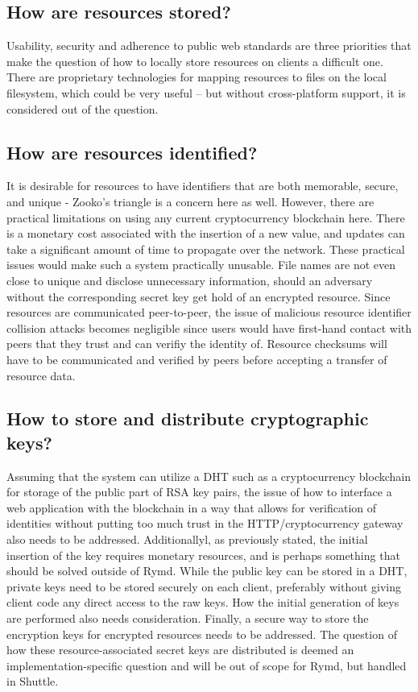 \subsection{How are resources stored?}
Usability, security and adherence to public web standards are three priorities that make the question of how to locally store resources on clients a difficult one. There are proprietary technologies for mapping resources to files on the local filesystem, which could be very useful – but without cross-platform support, it is considered out of the question.

\subsection{How are resources identified?}
It is desirable for resources to have identifiers that are both memorable, secure, and unique - Zooko’s triangle is a concern here as well. However, there are practical limitations on using any current cryptocurrency blockchain here. There is a monetary cost associated with the insertion of a new value, and updates can take a significant amount of time to propagate over the network. These practical issues would make such a system practically unusable. File names are not even close to unique and disclose unnecessary information, should an adversary without the corresponding secret key get hold of an encrypted resource. Since resources are communicated peer-to-peer, the issue of malicious resource identifier collision attacks becomes negligible since users would have first-hand contact with peers that they trust and can verifiy the identity of. Resource checksums will have to be communicated and verified by peers before accepting a transfer of resource data.

\subsection{How to store and distribute cryptographic keys?}
Assuming that the system can utilize a DHT such as a cryptocurrency blockchain for storage of the public part of RSA key pairs, the issue of how to interface a web application with the blockchain in a way that allows for verification of identities without putting too much trust in the HTTP/cryptocurrency gateway also needs to be addressed. Additionallyl, as previously stated, the initial insertion of the key requires monetary resources, and is perhaps something that should be solved outside of Rymd.
While the public key can be stored in a DHT, private keys need to be stored securely on each client, preferably without giving client code any direct access to the raw keys. How the initial generation of keys are performed also needs consideration. Finally, a secure way to store the encryption keys for encrypted resources needs to be addressed. The question of how these resource-associated secret keys are distributed is deemed an implementation-specific question and will be out of scope for Rymd, but handled in Shuttle.

